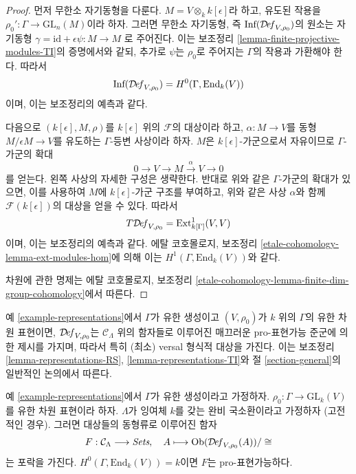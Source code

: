 \begin{proof}
먼저 무한소 자기동형을 다룬다. $M = V \otimes_k k[\epsilon]$라 하고,
유도된 작용을 $\rho_0' : \Gamma \to \text{GL}_n(M)$이라 하자.
그러면 무한소 자기동형, 즉
$\text{Inf}(\mathcal{D}\!\mathit{ef}_{V, \rho_0})$의 원소는 자기동형
$\gamma = \text{id} + \epsilon \psi : M \to M$
로 주어진다. 이는 보조정리 \ref{lemma-finite-projective-modules-TI}의
증명에서와 같되, 추가로 $\psi$는 $\rho_0$로 주어지는
$\Gamma$의 작용과 가환해야 한다. 따라서
$$
\text{Inf}(\mathcal{D}\!\mathit{ef}_{V, \rho_0}) = H^0(\Gamma, \text{End}_k(V))
$$
이며, 이는 보조정리의 예측과 같다.

\medskip\noindent
다음으로 $(k[\epsilon], M, \rho)$를 $k[\epsilon]$ 위의
$\mathcal{F}$의 대상이라 하고, $\alpha : M \to V$를 동형
$M/\epsilon M \to V$를 유도하는 $\Gamma$-등변 사상이라 하자.
$M$은 $k[\epsilon]$-가군으로서 자유이므로 $\Gamma$-가군의 확대
$$
0 \to V \to M \xrightarrow{\alpha} V \to 0
$$
를 얻는다. 왼쪽 사상의 자세한 구성은 생략한다.
반대로 위와 같은 $\Gamma$-가군의 확대가 있으면, 이를 사용하여 $M$에
$k[\epsilon]$-가군 구조를 부여하고, 위와 같은 사상 $\alpha$와 함께
$\mathcal{F}(k[\epsilon])$의 대상을 얻을 수 있다. 따라서
$$
T\mathcal{D}\!\mathit{ef}_{V, \rho_0} = \mathop{\mathrm{Ext}}\nolimits^1_{k[\Gamma]}(V, V)
$$
이며, 이는 보조정리의 예측과 같다. 에탈 코호몰로지, 보조정리
\ref{etale-cohomology-lemma-ext-modules-hom}에 의해 이는
$H^1(\Gamma, \text{End}_k(V))$와 같다.

\medskip\noindent
차원에 관한 명제는 에탈 코호몰로지, 보조정리
\ref{etale-cohomology-lemma-finite-dim-group-cohomology}에서 따른다.
\end{proof}

\noindent
예 \ref{example-representations}에서 $\Gamma$가 유한 생성이고
$(V, \rho_0)$가 $k$ 위의 $\Gamma$의 유한 차원 표현이면,
$\mathcal{D}\!\mathit{ef}_{V, \rho_0}$는 $\mathcal{C}_\Lambda$ 위의
함자들로 이루어진 매끄러운 pro-표현가능 준군에 의한 제시를 가지며,
따라서 특히 (최소) versal 형식적 대상을 가진다. 이는 보조정리
\ref{lemma-representations-RS}, \ref{lemma-representations-TI}와
절 \ref{section-general}의 일반적인 논의에서 따른다.

\begin{lemma}
\label{lemma-representations-hull}
예 \ref{example-representations}에서 $\Gamma$가 유한 생성이라고 가정하자.
$\rho_0 : \Gamma \to \text{GL}_k(V)$를 유한 차원 표현이라 하자.
$\Lambda$가 잉여체 $k$를 갖는 완비 국소환이라고 가정하자
(고전적인 경우). 그러면 대상들의 동형류로 이루어진 함자
$$
F : \mathcal{C}_\Lambda \longrightarrow \textit{Sets},\quad
A \longmapsto \mathop{\mathrm{Ob}}\nolimits(\mathcal{D}\!\mathit{ef}_{V, \rho_0}(A))/\cong
$$
는 포락을 가진다. $H^0(\Gamma, \text{End}_k(V)) = k$이면
$F$는 pro-표현가능하다.
\end{lemma}


